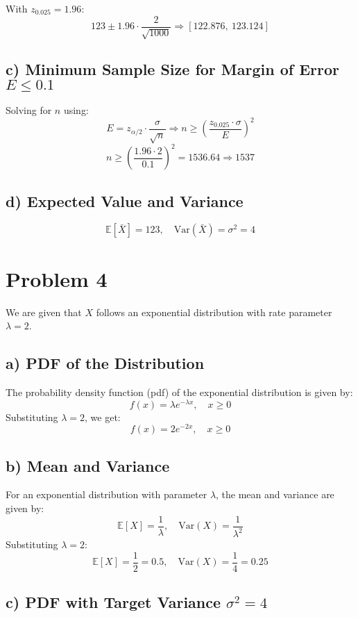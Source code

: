 \documentclass[12pt]{article}
\begin{document}
With $z_{0.025} = 1.96$:
\[
123 \pm 1.96 \cdot \frac{2}{\sqrt{1000}} \Rightarrow [122.876,\ 123.124]
\]

\subsection*{c) Minimum Sample Size for Margin of Error $E \leq 0.1$}

Solving for $n$ using:
\[
E = z_{\alpha/2} \cdot \frac{\sigma}{\sqrt{n}} \Rightarrow n \geq \left(\frac{z_{0.025} \cdot \sigma}{E}\right)^2
\]
\[
n \geq \left(\frac{1.96 \cdot 2}{0.1}\right)^2 = 1536.64 \Rightarrow \boxed{1537}
\]

\subsection*{d) Expected Value and Variance}

\[
\mathbb{E}[\bar{X}] = 123, \quad \text{Var}(\bar{X}) = \sigma^2 = 4
\]


\section*{Problem 4}

We are given that $X$ follows an exponential distribution with rate parameter $\lambda = 2$.

\subsection*{a) PDF of the Distribution}

The probability density function (pdf) of the exponential distribution is given by:
\[
f(x) = \lambda e^{-\lambda x}, \quad x \geq 0
\]
Substituting $\lambda = 2$, we get:
\[
f(x) = 2 e^{-2x}, \quad x \geq 0
\]

\subsection*{b) Mean and Variance}

For an exponential distribution with parameter $\lambda$, the mean and variance are given by:
\[
\mathbb{E}[X] = \frac{1}{\lambda}, \quad \text{Var}(X) = \frac{1}{\lambda^2}
\]
Substituting $\lambda = 2$:
\[
\mathbb{E}[X] = \frac{1}{2} = 0.5, \quad \text{Var}(X) = \frac{1}{4} = 0.25
\]

\subsection*{c) PDF with Target Variance $\sigma^2 = 4$}
\end{document}
